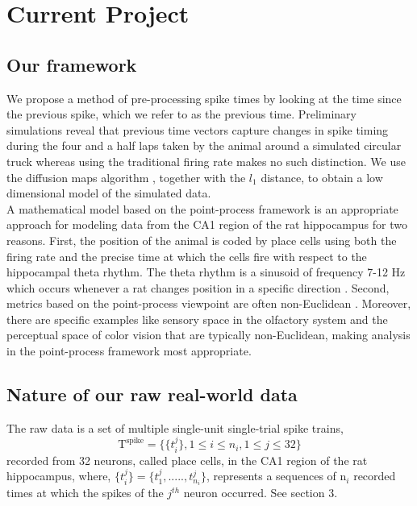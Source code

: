 
\section{Current Project}

\subsection{Our framework}

We propose a method of pre-processing spike times by looking at the time since the previous spike, which we refer to as the previous time. 
Preliminary simulations reveal that previous time vectors capture changes in spike timing during the four and a half laps taken by the animal around a simulated circular truck whereas using the traditional firing rate makes no such distinction. We use the diffusion maps algorithm \cite{coifman2006diffusion}, together with the $l_{1}$ distance, to obtain a low dimensional model of the simulated data.\\



A mathematical model based on the point-process framework is an appropriate approach for modeling  data from the CA1 region of the rat hippocampus for two reasons. First, the position of the animal is coded by place cells using both the firing rate and the precise time at which the cells fire with respect to the hippocampal theta rhythm.
The theta rhythm is a sinusoid of frequency 7-12 Hz which occurs whenever a rat changes position in  a specific direction \cite{OKeefe1971, Burgess1993}.
Second,  metrics based on the point-process viewpoint are often non-Euclidean \cite{Aronov2004, Victor2005}. Moreover, there are specific examples like sensory space in  the olfactory system and the perceptual space of color vision that are typically non-Euclidean, making analysis in the point-process framework most appropriate.\\


\subsection{Nature of our raw real-world data}
The raw data is a set of multiple single-unit single-trial spike trains,\\
\[ 
\text{T}^{\text{spike}} = \displaystyle \{ \{ t_{i}^{j} \} , 1 \leq i \leq n_{i}, 1 \leq j \leq 32 \}  
\]
recorded from 32 neurons, called  place cells, in the CA1 region of the rat hippocampus, where,
$\displaystyle  \{t_{i}^{j}\} =  \{t_{1}^{j}, ....., t_{n_{i}}^{j} \} $, represents  a sequences of n$_{i}$ recorded times at which the spikes of the $j^{th}$ neuron occurred. See section 3.



